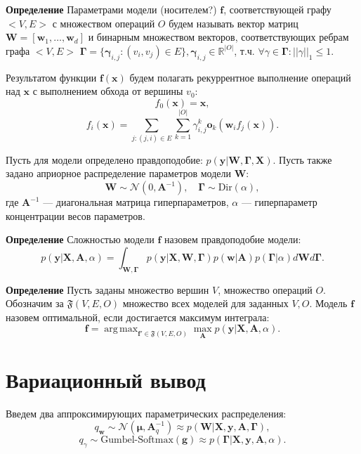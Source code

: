 \documentclass[12pt]{article}
\DeclareMathOperator*{\argmax}{arg\,max}
\begin{document}
\textbf{Определение} Параметрами модели (носителем?) $\mathbf{f}$, соответствующей графу $<V,E>$ с множеством операций $O$ будем называть вектор матриц $\mathbf{W} = [\mathbf{w}_1, \dots, \mathbf{w}_d]$ и бинарным множеством векторов, соответствующих ребрам графа $<V,E>$  $\boldsymbol{\Gamma} = \{\boldsymbol{\gamma}_{i,j}: (v_i,v_j) \in E \}, \boldsymbol{\gamma}_{i,j} \in \mathbb{R}^{|O|}$, т.ч. $\forall \gamma \in \boldsymbol{\Gamma}: ||\gamma||_1 \leq 1$.

Результатом функции $\mathbf{f}(\mathbf{x})$ будем полагать рекуррентное выполнение операций над $\mathbf{x}$ с выполнением обхода от вершины $v_0$:
\[
    f_0(\mathbf{x}) = \mathbf{x},
\]
\[
    f_i(\mathbf{x}) = \sum_{j: (j,i) \in E} \sum_{k = 1}^{|O|} {\gamma}^k_{i,j} \mathbf{o}_{k}  (\mathbf{w}_i f_j(\mathbf{x})). 
\]

Пусть для модели определено правдоподобие: $p(\mathbf{y}|\mathbf{W},\boldsymbol{\Gamma}, \mathbf{X})$. Пусть также задано априорное распределение параметров модели $\mathbf{W}$:
\[
    \mathbf{W} \sim \mathcal{N}(0, \mathbf{A}^{-1}), \quad \boldsymbol{\Gamma} \sim \text{Dir}(\alpha),
\]
где $\mathbf{A}^{-1}$ --- диагональная матрица гиперпараметров, $\alpha$ --- гиперпараметр концентрации весов параметров.

\textbf{Определение} Сложностью модели $\mathbf{f}$ назовем правдоподобие модели: 
\begin{equation}
\label{eq:evidence}
	p(\mathbf{y}|\mathbf{X},\mathbf{A},\alpha) = \int_{\mathbf{W}, \boldsymbol{\Gamma} } p(\mathbf{y}|\mathbf{X},\mathbf{W},  \boldsymbol{\Gamma})p(\mathbf{w}|\mathbf{A})p(\boldsymbol{\Gamma}|\alpha)d\mathbf{W}d\mathbf{\Gamma}.
\end{equation}


\textbf{Определение} Пусть заданы множество вершин $V$, множество операций $O$. Обозначим за $\mathfrak{F}(V,E,O)$ множество всех моделей для заданных $V,O$.
Модель $\mathbf{f}$ назовем оптимальной, если достигается максимум интеграла:
\[
    \mathbf{f} = \argmax_{\mathbf{f}' \in \mathfrak{F}(V,E,O)}\max_{\mathbf{A}} p(\mathbf{y}|\mathbf{X},\mathbf{A},\alpha).
\]

\newpage

\section{Вариационный вывод}
Введем два аппроксимирующих параметрических распределения: 
$$
q_\mathbf{w} \sim \mathcal{N}(\boldsymbol{\mu}, \mathbf{A}_q^{-1}) \approx p(\mathbf{W}|\mathbf{X}, \mathbf{y}, \mathbf{A}, \boldsymbol{\Gamma}),
$$
$$
q_\gamma \sim \text{Gumbel-Softmax}(\mathbf{g}) \approx p(\boldsymbol{\Gamma}|\mathbf{X}, \mathbf{y}, \mathbf{A}, \alpha).
$$
\end{document}
